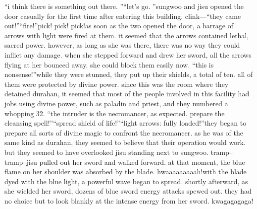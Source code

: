 “i think there is something out there.
”“let’s go.
”sungwoo and jisu opened the door casually for the first time after entering this building.
clink―“they came out!”“fire!”pick! pick! pick!as soon as the two opened the door, a barrage of arrows with light were fired at them.
it seemed that the arrows contained lethal, sacred power.
however, as long as she was there, there was no way they could inflict any damage.
when she stepped forward and drew her sword, all the arrows flying at her bounced away.
 she could block them easily now.
“this is nonsense!”while they were stunned, they put up their shields, a total of ten.
 all of them were protected by divine power.
since this was the room where they detained durahan, it seemed that most of the people involved in this facility had jobs using divine power, such as paladin and priest, and they numbered a whopping 32.
“the intruder is the necromancer, as expected.
 prepare the cleansing spell!”“spread shield of life!”“light arrows: fully loaded!”they began to prepare all sorts of divine magic to confront the necromancer.
 as he was of the same kind as durahan, they seemed to believe that their operation would work.
but they seemed to have overlooked jisu standing next to sungwoo.
tramp– tramp–jisu pulled out her sword and walked forward.
 at that moment, the blue flame on her shoulder was absorbed by the blade.
hwaaaaaaaaah!with the blade dyed with the blue light, a powerful wave began to spread.
shortly afterward, as she wielded her sword, dozens of blue sword energy attacks spewed out.
they had no choice but to look blankly at the intense energy from her sword.
kwagagagaga!

 